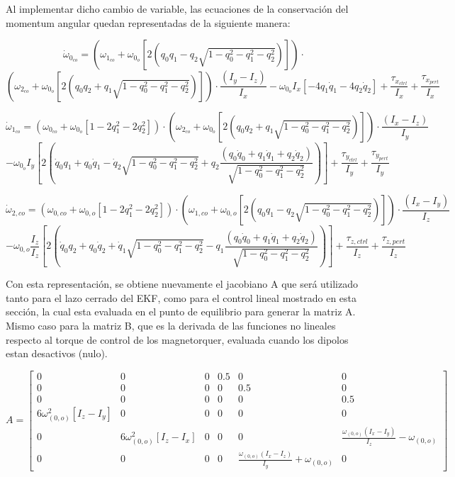 Al implementar dicho cambio de variable, las ecuaciones de la conservación del momentum angular quedan representadas de la siguiente manera:

\[
\dot{\omega}_{0_{co}} = \left( \omega_{1_{co}} + \omega_{0_o} \left[ 2\left( q_0 q_1 - q_2 \sqrt{1 - q_0^2 - q_1^2 - q_2^2} \right) \right] \right) \cdot
\]
\[
 \left( \omega_{2_{co}} + \omega_{0_o} \left[ 2\left( q_0 q_2 + q_1 \sqrt{1 - q_0^2 - q_1^2 - q_2^2} \right) \right] \right) \cdot \frac{(I_y - I_z)}{I_x} - \omega_{0_o} I_x \left[ -4q_1 \dot{q}_1 - 4q_2 \dot{q}_2 \right] + \frac{\tau_{x_{ctrl}}}{I_x} + \frac{\tau_{x_{pert}}}{I_x}
\]

\[
\dot{\omega}_{1_{co}} = \left( \omega_{0_{co}} + \omega_{0_o} \left[ 1 - 2q_1^2 - 2q_2^2 \right] \right) \cdot \left( \omega_{2_{co}} + \omega_{0_o} \left[ 2\left( q_0 q_2 + q_1 \sqrt{1 - q_0^2 - q_1^2 - q_2^2} \right) \right] \right) \cdot \frac{(I_x - I_z)}{I_y}
\]
\[
- \omega_{0_o} I_y \left[ 2\left( \dot{q}_0 q_1 + q_0 \dot{q}_1 - \dot{q}_2 \sqrt{1 - q_0^2 - q_1^2 - q_2^2} + q_2 \frac{(q_0 \dot{q}_0 + q_1 \dot{q}_1 + q_2 \dot{q}_2)}{\sqrt{1 - q_0^2 - q_1^2 - q_2^2}} \right) \right] + \frac{\tau_{y_{ctrl}}}{I_y} + \frac{\tau_{y_{pert}}}{I_y}
\]

\[
\dot{\omega}_{2,co} = \left( \omega_{0,co} + \omega_{0,o} \left[ 1 - 2q_1^2 - 2q_2^2 \right] \right) \cdot \left( \omega_{1,co} + \omega_{0,o} \left[ 2 \left( q_0 q_1 - q_2 \sqrt{1 - q_0^2 - q_1^2 - q_2^2} \right) \right] \right) \cdot \frac{(I_x - I_y)}{I_z} 
\]
\[
- \omega_{0,o} \frac{I_z}{I_z} \left[ 2 \left( \dot{q}_0 q_2 + q_0 \dot{q}_2 + \dot{q}_1 \sqrt{1 - q_0^2 - q_1^2 - q_2^2} - q_1 \frac{(q_0 \dot{q}_0 + q_1 \dot{q}_1 + q_2 \dot{q}_2)}{\sqrt{1 - q_0^2 - q_1^2 - q_2^2}} \right) \right] 
+ \frac{\tau_{z,ctrl}}{I_z} + \frac{\tau_{z,pert}}{I_z}
\]

Con esta representación, se obtiene nuevamente el jacobiano A que será utilizado tanto para el lazo cerrado del \gls{EKF}, como para el control lineal mostrado en esta sección, la cual esta evaluada en el punto de equilibrio para generar la matriz A. Mismo caso para la matriz B, que es la derivada de las funciones no lineales respecto al torque de control de los magnetorquer, evaluada cuando los dipolos estan desactivos (nulo).

\[
A = \begin{bmatrix}
	0 & 0 & 0 & 0.5 & 0 & 0 \\
	0 & 0 & 0 & 0 & 0.5 & 0 \\
	0 & 0 & 0 & 0 & 0 & 0.5 \\
	6\omega_{(0,o)}^2 [I_z - I_y] & 0 & 0 & 0 & 0 & 0 \\
	0 & 6\omega_{(0,o)}^2 [I_z - I_x] & 0 & 0 & 0 & \frac{\omega_{(0,o)} (I_x - I_y)}{I_z} - \omega_{(0,o)} \\
	0 & 0 & 0 & 0 & \frac{\omega_{(0,o)} (I_x - I_z)}{I_y} + \omega_{(0,o)} & 0
\end{bmatrix}
\]

